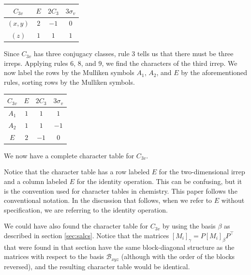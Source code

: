 \documentclass{article}
\begin{document}
    \begin{table}[htbp]
        \centering
        \renewcommand{\arraystretch}{1.5}
        \begin{tabular}{c|ccc}
            $C_{3v}$ & $E$ & $2C_3$ & $3\sigma_{v}$\\
            \hline
            \color{red}$(x,y)$ & \color{red}$2$ & \color{red}$-1$ & \color{red}$0$\\
            \color{blue}$(z)$ & \color{blue}$1$ & \color{blue}$1$ & \color{blue}$1$
        \end{tabular}
    \end{table}
    
    Since $C_{3v}$ has three conjugacy classes, rule 3 tells us that there must be three irreps. Applying rules 6, 8, and 9, we find the characters of the third irrep. We now label the rows by the Mulliken symbols $A_1$, $A_2$, and $E$ by the aforementioned rules, sorting rows by the Mulliken symbols.
    
    \begin{table}[htbp]
        \centering
        \renewcommand{\arraystretch}{1.5}
        \begin{tabular}{c|ccc}
            $C_{3v}$ & $E$ & $2C_3$ & $3\sigma_{v}$\\
            \hline
            $A_1$ & $1$ & $1$ & $1$\\
            $A_2$ & $1$ & $1$ & $-1$\\
            $E$ & $2$ & $-1$ & $0$\\
        \end{tabular}
    \end{table}

    We now have a complete character table for $C_{3v}$.

    Notice that the character table has a row labeled $E$ for the two-dimensional irrep and a column labeled $E$ for the identity operation. This can be confusing, but it is the convention used for character tables in chemistry. This paper follows the conventional notation. In the discussion that follows, when we refer to $E$ without specification, we are referring to the identity operation.

    We could have also found the character table for $C_{3v}$ by using the basis $\beta$ as described in section \ref{sec:salcs}. Notice that the matrices $[M_i]_\gamma=P[M_i]_\beta P^\top$ that were found in that section have the same block-diagonal structure as the matrices with respect to the basis $\mathcal B_{xyz}$ (although with the order of the blocks reversed), and the resulting character table would be identical.
\end{document}
